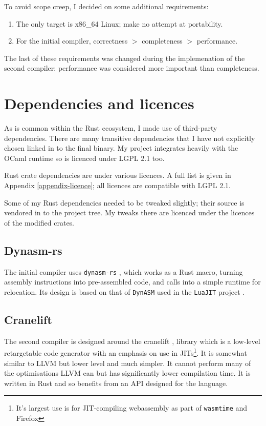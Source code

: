 To avoid scope creep, I decided on some additional requirements:

\begin{enumerate}
    \item The only target is x86\_64 Linux; make no attempt at portability.
    \item For the initial compiler, correctness $>$ completeness $>$ performance.
\end{enumerate}

The last of these requirements was changed during the implemenation of the second compiler:
performance was considered more important than completeness.

\section{Dependencies and licences}

As is common within the Rust ecosystem, I made use of third-party dependencies. There are many
transitive dependencies that I have not explicitly chosen linked in to the final binary. My project
integrates heavily with the OCaml runtime so is licenced under LGPL 2.1 too.

Rust crate dependencies are under various licences. A full list is given in Appendix
\ref{appendix-licence}; all licences are compatible with LGPL 2.1.

Some of my Rust dependencies needed to be tweaked slightly; their source is
vendored in to the project tree. My tweaks there are licenced under the licences of the modified
crates.

\subsection{Dynasm-rs}

The initial compiler uses \texttt{dynasm-rs} \cite{dynasmrs}, which works as a Rust macro, turning
assembly instructions into pre-assembled code, and calls into a simple runtime for relocation. Its
design is based on that of \texttt{DynASM} used in the \texttt{LuaJIT} project \cite{dynasm}.

\subsection{Cranelift}

The second compiler is designed around the cranelift \cite{cranelift}, library which is a
low-level retargetable code generator with an emphasis on use in JITs\footnote{It's largest use is
    for JIT-compiling webassembly as part of \texttt{wasmtime} and Firefox}. It is somewhat similar
to
LLVM but lower level and much simpler. It cannot perform many of the optimisations LLVM can but has
significantly lower compilation time. It is written in Rust and so benefits from an API designed
for the language.

